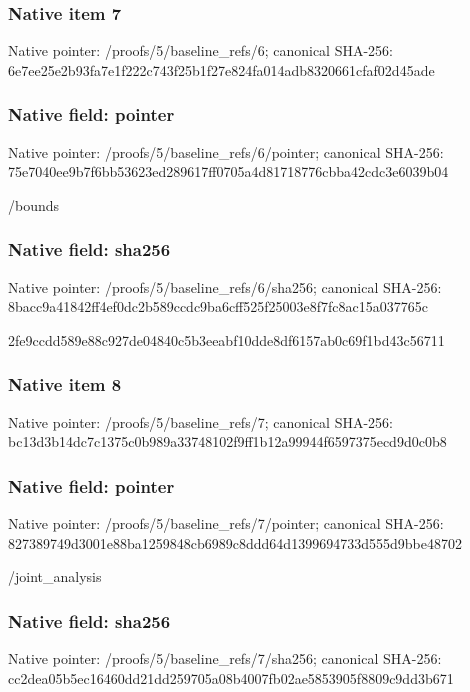 \documentclass[10pt,a4paper]{article}
\begin{document}
\subsubsection{Native item 7}
Native pointer: /proofs/5/baseline\_\allowbreak{}refs/6; canonical SHA-256: 6e7ee25e2b93fa7e1f222c743f25b1f27e824fa014adb8320661cfaf02d45ade

\subsubsection{Native field: pointer}
Native pointer: /proofs/5/baseline\_\allowbreak{}refs/6/pointer; canonical SHA-256: 75e7040ee9b7f6bb53623ed289617ff0705a4d81718776cbba42cdc3e6039b04

\begingroup\raggedright\sloppy /\allowbreak{}bounds\par\endgroup

\subsubsection{Native field: sha256}
Native pointer: /proofs/5/baseline\_\allowbreak{}refs/6/sha256; canonical SHA-256: 8bacc9a41842ff4ef0dc2b589ccdc9ba6cff525f25003e8f7fc8ac15a037765c

\begingroup\raggedright\sloppy 2fe9ccdd589e88c927de04840c5b3eeabf10dde8df6157ab0c69f1bd43c56711\par\endgroup

\subsubsection{Native item 8}
Native pointer: /proofs/5/baseline\_\allowbreak{}refs/7; canonical SHA-256: bc13d3b14dc7c1375c0b989a33748102f9ff1b12a99944f6597375ecd9d0c0b8

\subsubsection{Native field: pointer}
Native pointer: /proofs/5/baseline\_\allowbreak{}refs/7/pointer; canonical SHA-256: 827389749d3001e88ba1259848cb6989c8ddd64d1399694733d555d9bbe48702

\begingroup\raggedright\sloppy /\allowbreak{}joint\_\allowbreak{}analysis\par\endgroup

\subsubsection{Native field: sha256}
Native pointer: /proofs/5/baseline\_\allowbreak{}refs/7/sha256; canonical SHA-256: cc2dea05b5ec16460dd21dd259705a08b4007fb02ae5853905f8809c9dd3b671
\end{document}
